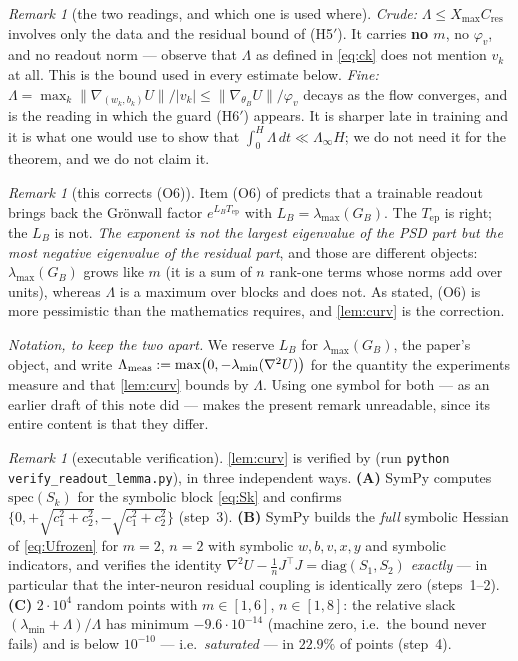 \documentclass[11pt]{article}
\theoremstyle{remark}
\newtheorem{remark}[theorem]{Remark}
\newcommand{\Tep}{T_{\mathrm{ep}}}
\newcommand{\Cres}{C_{\mathrm{res}}}
\newcommand{\Xmax}{X_{\max}}
\newcommand{\hyplabel}[1]{\textup{(#1)}}
\begin{document}
\begin{remark}[the two readings, and which one is used where]\label{rem:readings}
\emph{Crude:} $\Lambda\le\Xmax\Cres$ involves only the data and the residual
bound of \hyplabel{H5$'$}. It carries \textbf{no $m$}, no $\varphi_v$, and no
readout norm --- observe that $\Lambda$ as defined in \eqref{eq:ck} does not
mention $v_k$ at all. This is the bound used in every estimate below.
\emph{Fine:} $\Lambda=\max_k\|\nabla_{(w_k,b_k)}U\|/|v_k|\le
\|\nabla_{\theta_B}U\|/\varphi_v$ decays as the flow converges, and is the
reading in which the guard \hyplabel{H6$'$} appears. It is sharper late in
training and it is what one would use to show that $\int_0^H\Lambda\,dt\ll
\Lambda_\infty H$; we do not need it for the theorem, and we do not claim it.
\end{remark}

\begin{remark}[this corrects (O6)]\label{rem:O6}
Item (O6) of \cite{paper} predicts that a trainable readout brings back the
Gr\"onwall factor $e^{L_B\Tep}$ with $L_B=\lambda_{\max}(G_B)$. The $\Tep$ is
right; the $L_B$ is not. \emph{The exponent is not the largest eigenvalue of the
PSD part but the most negative eigenvalue of the residual part}, and those are
different objects: $\lambda_{\max}(G_B)$ grows like $m$ (it is a sum of $n$ rank-one
terms whose norms add over units), whereas $\Lambda$ is a maximum over blocks and
does not. As stated, (O6) is more pessimistic than the mathematics requires,
and \cref{lem:curv} is the correction.

\emph{Notation, to keep the two apart.} We reserve $L_B$ for
$\lambda_{\max}(G_B)$, the paper's object, and write
$\Lambda_{\rm meas}:=\max\bigl(0,-\lambda_{\min}(\nabla^2U)\bigr)$ for the
quantity the experiments measure and that \cref{lem:curv} bounds by $\Lambda$.
Using one symbol for both --- as an earlier draft of this note did --- makes the
present remark unreadable, since its entire content is that they differ.
\end{remark}

\begin{remark}[executable verification]\label{rem:verif}
\cref{lem:curv} is verified by
 (run
\texttt{python verify\_readout\_lemma.py}), in three independent ways.
\textbf{(A)} SymPy computes $\mathrm{spec}(S_k)$ for the symbolic block
\eqref{eq:Sk} and confirms $\{0,+\sqrt{c_1^2+c_2^2},-\sqrt{c_1^2+c_2^2}\}$
(step~3). \textbf{(B)} SymPy builds the \emph{full} symbolic Hessian of
\eqref{eq:Ufrozen} for $m=2$, $n=2$ with symbolic
$w,b,v,x,y$ and symbolic indicators, and verifies the identity
$\nabla^2U-\frac1nJ^\top J=\mathrm{diag}(S_1,S_2)$ \emph{exactly} --- in
particular that the inter-neuron residual coupling is identically zero
(steps~1--2). \textbf{(C)} $2\cdot10^4$ random points with $m\in[1,6]$,
$n\in[1,8]$: the relative slack $(\lambda_{\min}+\Lambda)/\Lambda$ has minimum
$-9.6\cdot10^{-14}$ (machine zero, i.e.\ the bound never fails) and is below
$10^{-10}$ --- i.e.\ \emph{saturated} --- in $22.9\%$ of points (step~4).
\end{remark}
\end{document}
